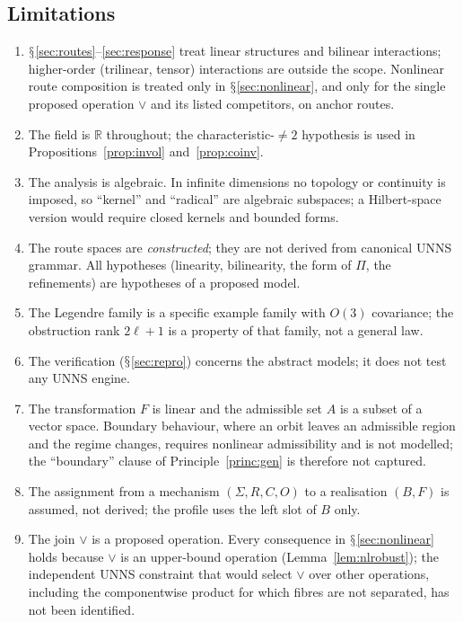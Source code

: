 \documentclass[11pt,a4paper]{article}
\renewcommand{\S}{\ensuremath{\mathsection}}
\newcommand{\RR}{\mathbb{R}}
\newcommand{\vj}{\mathbin{\vee}}
\theoremstyle{plain}
\theoremstyle{definition}
\begin{document}
\subsection{Limitations}\label{sec:limits}
\begin{enumerate}[label=(L\arabic*)]
\item \S\ref{sec:routes}--\ref{sec:response} treat linear structures and bilinear interactions; higher-order (trilinear, tensor) interactions are outside the scope. Nonlinear route composition is treated only in \S\ref{sec:nonlinear}, and only for the single proposed operation $\vj$ and its listed competitors, on anchor routes.
\item The field is $\RR$ throughout; the characteristic-$\neq2$ hypothesis is used in Propositions~\ref{prop:invol} and~\ref{prop:coinv}.
\item The analysis is algebraic. In infinite dimensions no topology or continuity is imposed, so ``kernel'' and ``radical'' are algebraic subspaces; a Hilbert-space version would require closed kernels and bounded forms.
\item The route spaces are \emph{constructed}; they are not derived from canonical UNNS grammar. All hypotheses (linearity, bilinearity, the form of $\Pi$, the refinements) are hypotheses of a proposed model.
\item The Legendre family is a specific example family with $O(3)$ covariance; the obstruction rank $2\ell+1$ is a property of that family, not a general law.
\item The verification (\S\ref{sec:repro}) concerns the abstract models; it does not test any UNNS engine.
\item The transformation $F$ is linear and the admissible set $A$ is a subset of a vector space. Boundary behaviour, where an orbit leaves an admissible region and the regime changes, requires nonlinear admissibility and is not modelled; the ``boundary'' clause of Principle~\ref{princ:gen} is therefore not captured.
\item The assignment from a mechanism $(\Sigma,R,C,O)$ to a realisation $(B,F)$ is assumed, not derived; the profile uses the left slot of $B$ only.
\item The join $\vj$ is a proposed operation. Every consequence in \S\ref{sec:nonlinear} holds because $\vj$ is an upper-bound operation (Lemma~\ref{lem:nlrobust}); the independent UNNS constraint that would select $\vj$ over other operations, including the componentwise product for which fibres are not separated, has not been identified.

\end{enumerate}
\end{document}
